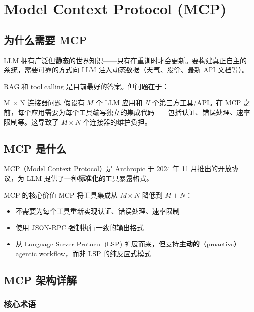 \documentclass[a4paper]{article}
\begin{document}
\section{Model Context Protocol (MCP)}

\subsection{为什么需要 MCP}

LLM 拥有广泛但\textbf{静态}的世界知识——只有在重训时才会更新。要构建真正自主的系统，需要可靠的方式向 LLM 注入动态数据（天气、股价、最新 API 文档等）。

RAG 和 tool calling 是目前最好的答案。但问题在于：

\begin{knowledgebox}{M $\times$ N 连接器问题}
假设有 $M$ 个 LLM 应用和 $N$ 个第三方工具/API。在 MCP 之前，每个应用需要为每个工具编写独立的集成代码——包括认证、错误处理、速率限制等。这导致了 $M \times N$ 个连接器的维护负担。
\end{knowledgebox}

\subsection{MCP 是什么}

MCP（Model Context Protocol）是 Anthropic 于 2024 年 11 月推出的开放协议，为 LLM 提供了一种\textbf{标准化}的工具暴露格式。

\begin{importantbox}{MCP 的核心价值}
MCP 将工具集成从 $M \times N$ 降低到 $M + N$：
\begin{itemize}
    \item 不需要为每个工具重新实现认证、错误处理、速率限制
    \item 使用 JSON-RPC 强制执行一致的输出格式
    \item 从 Language Server Protocol (LSP) 扩展而来，但支持\textbf{主动的}（proactive）agentic workflow，而非 LSP 的纯反应式模式
\end{itemize}
\end{importantbox}

\subsection{MCP 架构详解}

\subsubsection{核心术语}
\end{document}

